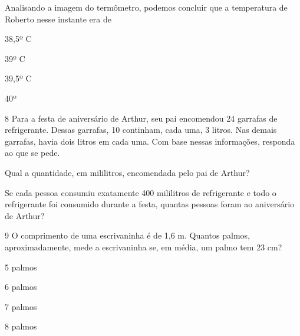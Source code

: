 \begin{multicols}{2}
Analisando a imagem do termômetro, podemos concluir que a temperatura de Roberto nesse instante era de

\begin{minipage}{.5\textwidth}
\begin{escolha}

\item
  38,5º C
\item
  39º C
\item
  39,5º C
\item
  40º
\end{escolha}
\end{minipage}

\num{8} Para a festa de aniversário de Arthur, seu pai encomendou 24 garrafas de
refrigerante. Dessas garrafas, 10 continham, cada uma, 3 litros. Nas
demais garrafas, havia dois litros em cada uma. Com base nessas
informações, responda ao que se pede.

\begin{escolha}
\item Qual a quantidade, em mililitros, encomendada pelo pai de Arthur?


\item Se cada pessoa consumiu exatamente 400 mililitros de refrigerante e
  todo o refrigerante foi consumido durante a festa, quantas pessoas
  foram ao aniversário de Arthur?

\end{escolha}

\num{9} O comprimento de uma escrivaninha é de 1,6 m. Quantos palmos,
aproximadamente, mede a escrivaninha se, em média, um palmo tem 23 cm?

\begin{minipage}{.5\textwidth}
\begin{escolha}
\item
  5 palmos
\item
  6 palmos
\item
  7 palmos
\item
  8 palmos
\end{escolha}
\end{minipage}
\end{multicols}
